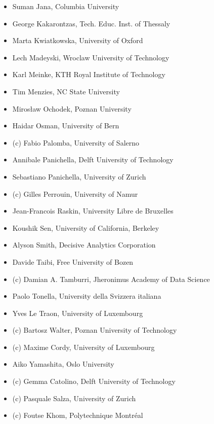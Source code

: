 \begin{itemize}
	\item Suman Jana, Columbia University\smallskip
	\item George Kakarontzas, Tech. Educ. Inst. of Thessaly\smallskip
	\item Marta Kwiatkowska, University of Oxford\smallskip
	\item Lech Madeyski, Wroclaw University of Technology\smallskip
	\item Karl Meinke, KTH Royal Institute of Technology\smallskip
	\item Tim Menzies, NC State University\smallskip
	\item Mirosław Ochodek, Poznan University\smallskip
	\item Haidar Osman, University of Bern\smallskip
	\item (c) Fabio Palomba, University of Salerno\smallskip
	\item Annibale Panichella, Delft University of Technology\smallskip
	\item Sebastiano Panichella, University of Zurich\smallskip
	\item (c) Gilles Perrouin, University of Namur\smallskip
	\item Jean-Francois Raskin, University Libre de Bruxelles\smallskip
	\item Koushik Sen, University of California, Berkeley\smallskip
	\item Alyson Smith, Decisive Analytics Corporation\smallskip
	\item Davide Taibi, Free University of Bozen\smallskip
	\item (c) Damian A. Tamburri, Jheronimus Academy of Data Science\smallskip
	\item Paolo Tonella, University della Svizzera italiana\smallskip
	\item Yves Le Traon, University of Luxembourg\smallskip
	\item (c) Bartosz Walter, Poznan University of Technology\smallskip
	\item (c) Maxime Cordy, University of Luxembourg\smallskip
	\item Aiko Yamashita, Oslo University\smallskip
	\item (c) Gemma Catolino, Delft University of Technology\smallskip
	\item (c) Pasquale Salza, University of Zurich\smallskip
	\item (c) Foutse Khom, Polytechnique Montréal\smallskip
\end{itemize}
